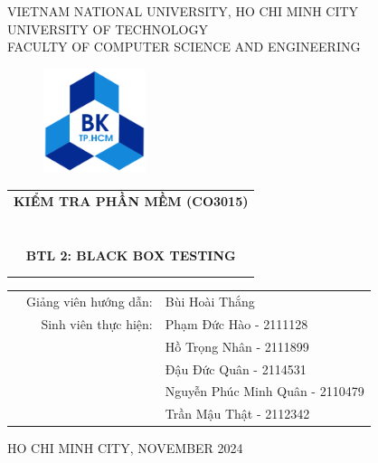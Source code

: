 \documentclass[a4paper, 12pt]{article}
\begin{document}
\begin{titlepage}
\begin{center}
VIETNAM NATIONAL UNIVERSITY, HO CHI MINH CITY \\
UNIVERSITY OF TECHNOLOGY \\
FACULTY OF COMPUTER SCIENCE AND ENGINEERING
\end{center}
\vspace{1cm}

\begin{figure}[h!]
\begin{center}
\includegraphics[width=3cm]{hcmut.png}
\end{center}
\end{figure}

\vspace{1cm}


\begin{center}
\begin{tabular}{c}
\multicolumn{1}{l}{\textbf{{\Large KIỂM TRA PHẦN MỀM (CO3015)}}}\\

~~\\
\hline
\\
\\
\textbf{{\Huge BTL 2: BLACK BOX TESTING}}\\
\\

\\
\hline
\end{tabular}
\end{center}

\vspace{3cm}

\begin{table}[h]
\begin{tabular}{rrl}
\hspace{3 cm} & Giảng viên hướng dẫn: & Bùi Hoài Thắng\\

& Sinh viên thực hiện:
& Phạm Đức Hào - 2111128\\
&& Hồ Trọng Nhân - 2111899\\
&& Đậu Đức Quân - 2114531\\
&& Nguyễn Phúc Minh Quân - 2110479\\
&& Trần Mậu Thật - 2112342
\end{tabular}
\end{table}

\begin{center}
{\footnotesize HO CHI MINH CITY, NOVEMBER 2024}
\end{center}
\end{titlepage}
\end{document}

